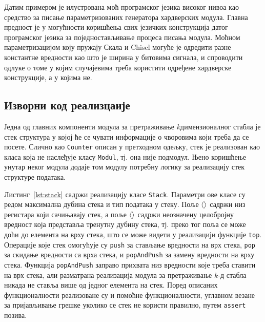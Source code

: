 \documentclass[master]{finthesis}
\newcommand*{\kdim}[1]{\texorpdfstring{$k$\Hyphdash}{k-}димензионал#1}
\newcommand*{\kd}{\texorpdfstring{$k$}{k}-д }
\newcommand*{\correctmath}[1]{%
    \ifcsname mathCorrectionFor#1\endcsname%
        \csname mathCorrectionFor#1\endcsname%
    \else%
        #1%
    \fi%
}
\newcommand*{\mfield}[1]{{\langle\correctmath{#1}\/\rangle}}
\newcommand*{\field}[1]{\texorpdfstring{$\mfield{#1}$}{⟨#1⟩}}
\newcommand*{\prog}[1]{\texttt{#1}}
\newcommand*{\func}[1]{\prog{#1}}
\begin{document}
Датим примером је илустрована моћ програмског језика високог нивоа као средство за писање параметризованих генератора хардверских модула. Главна предност је у могућности коришћења свих језичких конструкција датог програмског језика за поједностављивање процеса писања модула. Моћном параметризацијом коју пружају Скала и Chisel могуће је одредити разне константне вредности као што је ширина у битовима сигнала, и спроводити одлуке о томе у којим случајевима треба користити одређене хардверске конструкције, а у којима не.

\subsection{Изворни код реализцаије}

Једна од главних компоненти модула за претраживање \kdim{ног} стабла је стек структура у којој ће се чувати информације о чворовима који треба да се посете. Слично као \prog{Counter} описан у претходном одељку, стек је реализован као класа која не наслеђује класу \prog{Modul}, тј. она није подмодул. Њено коришћење унутар неког модула додаје том модулу потребну логику за реализацију стек структуре података.

Листинг~\ref{lst:stack} садржи реализацију класе \prog{Stack}. Параметри ове класе су редом максимална дубина стека и тип података у стеку. Поље \field{regs} садржи низ регистара који сачињавају стек, а поље \field{depth} садржи неозначену целобројну вредност која представља тренутну дубину стека, тј. преко тог поља се може доћи до елемента на врху стека, што се може видети у реализацији функције \func{top}. Операције које стек омогућује су \func{push} за стављање вредности на врх стека, \func{pop} за скидање вредности са врха стека, и \func{popAndPush} за замену вредности на врху стека. Функција \func{popAndPush} заправо прихвата низ вредности које треба ставити на врх стека, али разматрана реализација модула за претраживање \kd стабла никада не ставља више од једног елемента на стек. Поред описаних функционалности реализоване су и помоћне функционалности, углавном везане за пријављивање грешке уколико се стек не користи правилно, путем \prog{assert} позива.
\end{document}
